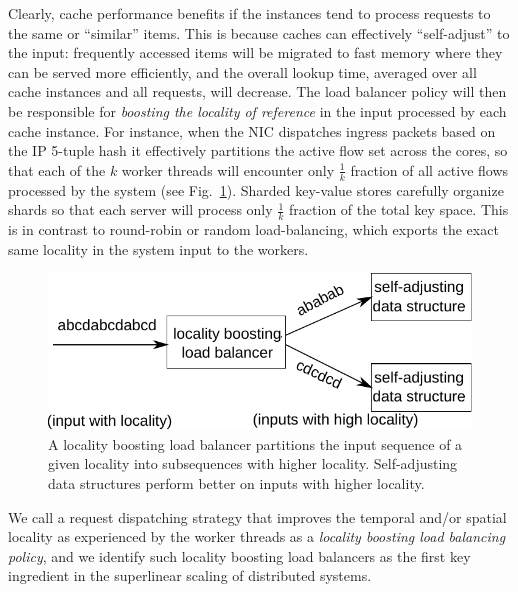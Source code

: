 \documentclass[letterpaper,twocolumn,10pt]{article}
\begin{document}
Clearly, cache performance benefits if the instances tend to process requests to the same or ``similar'' items. This is because caches can effectively ``self-adjust'' to the input: frequently accessed items will be migrated to fast memory where they can be served more efficiently, and the overall lookup time, averaged over all cache instances and all requests, will decrease. The load balancer policy will then be responsible for \emph{boosting the locality of reference} in the input processed by each cache instance. For instance, when the NIC dispatches ingress packets based on the IP 5-tuple hash it effectively partitions the active flow set across the cores, so that each of the $k$ worker threads will encounter only $\frac1{k}$ fraction of all active flows processed by the system (see Fig.~\ref{fig:locality-boosting-lb}). Sharded key-value stores carefully organize shards so that each server will process only $\frac1{k}$ fraction of the total key space.  This is in contrast to round-robin or random load-balancing, which exports the exact same locality in the system input to the workers.

\begin{figure}[t]
  \centering
  \includegraphics[width=.85\linewidth]{fig/schema.pdf}
  \caption{A locality boosting load balancer partitions the input sequence of a given locality into
    subsequences with higher locality. Self-adjusting data structures perform better on inputs with
    higher locality.}
  \label{fig:locality-boosting-lb}
\end{figure}

We call a request dispatching strategy that improves the temporal and\slash or spatial locality as experienced by the worker threads as a \emph{locality boosting load balancing policy}, and we identify such locality boosting load balancers as the first key ingredient in the superlinear scaling of distributed systems.
\end{document}
